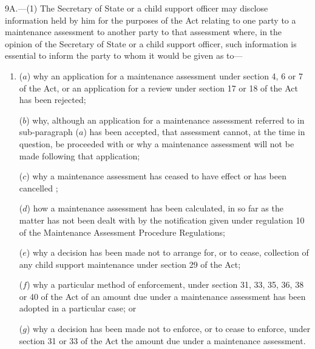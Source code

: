 \documentclass[a4paper,12pt]{article}
\begin{document}
9A.—(1) The Secretary of State or a child support officer may disclose information 
held by him for the purposes of the Act relating to  %
one party to a maintenance assessment to another party to that assessment where, in the opinion of the Secretary of State or a child support officer, such information is essential to inform the party to whom it would be given as to—
\begin{enumerate}\item[]
($a$) why an application for a maintenance assessment under section 4, 6 or 7 of the Act, or an application for a review under section 17 or 18 of the Act has been rejected;

($b$) why, although an application for a maintenance assessment referred to in sub-paragraph ($a$) has been accepted, that assessment cannot, at the time in question, be proceeded with or why a maintenance assessment will not be made following that application;

($c$) why a maintenance assessment has ceased to have effect or has been cancelled%
;

($d$) how a maintenance assessment has been calculated, in so far as the matter has not been dealt with by the notification given under regulation 10 of the Maintenance Assessment Procedure Regulations;

($e$) why a decision has been made not to arrange for, or to cease, collection of any child support maintenance under section 29 of the Act;

($f$) why a particular method of enforcement, under section 31, 33, 35, 36, 38 or 40 of the Act of an amount due under a maintenance assessment has been adopted in a particular case; or

($g$) why a decision has been made not to enforce, or to cease to enforce, under section 31 or 33 of the Act the amount due under a maintenance assessment.
\end{enumerate}
\end{document}
